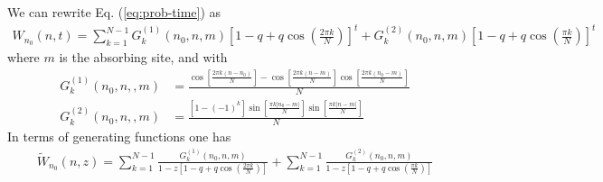 \documentclass[idelinks, superscriptaddress, amsmath, amssymb, aps, pre]{revtex4-2}
\begin{document}
We can rewrite Eq. (\ref{eq:prob-time}) as
\begin{align}
W_{n_0}(n,t)= \sum_{k=1}^{N-1}G^{(1)}_k(n_0,n,m)\left[1-q+q\cos\left(\frac{2 \pi k}{N}\right)\right]^t +G^{(2)}_k(n_0,n,m)\left[1-q+q\cos\left(\frac{\pi k}{N}\right)\right]^t 
\label{eq:compactprob_abs}
\end{align}
where $m$ is the absorbing site, and with
\begin{align}
G^{(1)}_k(n_0,n,,m)&= \frac{\cos\left[\frac{2\pi k (n-n_0)}{N}\right]-\cos\left[\frac{2\pi k (n-m)}{N}\right]\cos\left[\frac{2\pi k (n_0-m)}{N}\right]}{N} \nonumber \\
G^{(2)}_k(n_0,n,,m)&=\frac{\left[1-(-1)^k\right]\sin\left[\frac{\pi k |n_0-m|}{N}\right]\!\sin\left[\frac{\pi k |n-m|}{N}\right]}{N}
\label{eq:Gk}
\end{align}
In terms of generating functions one has
\begin{align}
\widetilde{W}_{n_0}(n,z)= \sum_{k=1}^{N-1}\frac{G^{(1)}_k(n_0,n,m)}{1-z\left[1-q+q\cos\left(\frac{2 \pi k}{N}\right)\right]} + \sum_{k=1}^{N-1}\frac{G^{(2)}_k(n_0,n,m)}{1-z\left[1-q+q\cos\left(\frac{\pi k}{N}\right)\right]} 
\label{eq:compactprob_abs_z}
\end{align}
\end{document}
